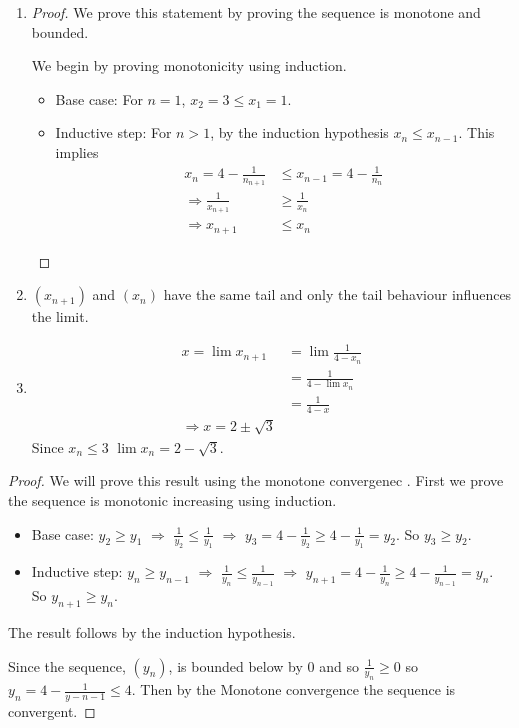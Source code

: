 \begin{enumerate}[label=(\alph*)]
    \item 
    \begin{proof}
        We prove this statement by proving the sequence is monotone and bounded.
        
        We begin by proving monotonicity using induction.
        \begin{itemize}
            \item Base case: For $n=1$, $x_2 = 3 \leq x_1 = 1$.
            \item Inductive step: For $n>1$, by the induction hypothesis $x_n \leq x_{n-1}$.
            This implies 
            \begin{align*}
                x_n = 4 - \frac{1}{n_{n+1}} &\leq x_{n-1} = 4 - \frac{1}{n_{n}} \\
                \Rightarrow \frac{1}{x_{n+1}} &\geq \frac{1}{x_n} \\
                \Rightarrow x_{n+1} &\leq x_n
            \end{align*}
        \end{itemize}
    \end{proof}

    \item 
    $(x_{n+1})$ and $(x_n)$ have the same tail and only the tail behaviour 
    influences the limit.

    \item 
    \begin{align*}
        x = \lim x_{n+1} &= \lim \frac{1}{4-x_n} \\
                    &= \frac{1}{4-\lim x_n} \\
                    &=         \frac{1}{4-x} \\
                    \Rightarrow x = 2\pm \sqrt 3
    \end{align*}
    Since $x_n \leq 3$ $\lim x_n = 2 - \sqrt 3$.
\end{enumerate}

\begin{proof}
    We will prove this result using the monotone convergenec \Thm.
    First we prove the sequence is monotonic increasing using 
    induction.

    \begin{itemize}
        \item Base case: $y_2 \geq y_1 $ $\Rightarrow$ $\frac{1}{y_2} \leq \frac{1}{y_1}$
        $\Rightarrow$ $y_3 = 4 - \frac{1}{y_2} \geq 4 - \frac{1}{y_1} = y_2$.
        So $y_3 \geq y_2$.

        \item Inductive step: $y_n \geq y_{n-1} $ $\Rightarrow$ $\frac{1}{y_{n}} \leq \frac{1}{y_{n-1}}$
        $\Rightarrow$ $y_{n+1} = 4 - \frac{1}{y_n} \geq 4 - \frac{1}{y_{n-1}} = y_n$.
        So $y_{n+1} \geq y_n$.
    \end{itemize} 
    The result follows by the induction hypothesis.

    Since the sequence, $(y_n)$, is bounded below by $0$ and so $\frac{1}{y_n} \geq 0$
     so $y_n = 4-\frac{1}{y-{n-1}}\leq 4$. 
     Then by the Monotone convergence \Thm the sequence is convergent.
\end{proof}

